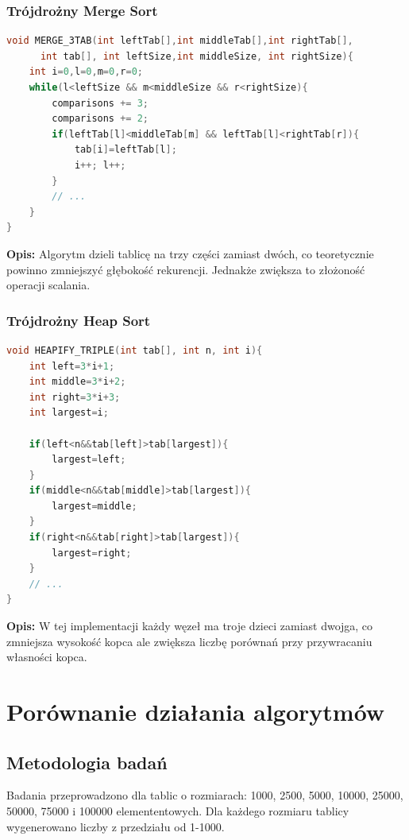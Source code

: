 \documentclass[12pt,a4paper]{article}
\begin{document}
\subsubsection{Trójdrożny Merge Sort}
\begin{lstlisting}[language=C++,caption=Merge Sort z trzema podtablicami]
void MERGE_3TAB(int leftTab[],int middleTab[],int rightTab[],
      int tab[], int leftSize,int middleSize, int rightSize){
    int i=0,l=0,m=0,r=0;
    while(l<leftSize && m<middleSize && r<rightSize){
        comparisons += 3;
        comparisons += 2;
        if(leftTab[l]<middleTab[m] && leftTab[l]<rightTab[r]){
            tab[i]=leftTab[l];
            i++; l++;
        }
        // ... 
    }
}
\end{lstlisting}
\textbf{Opis:} Algorytm dzieli tablicę na trzy części zamiast dwóch, co teoretycznie powinno zmniejszyć głębokość rekurencji. Jednakże zwiększa to złożoność operacji scalania.

\subsubsection{Trójdrożny Heap Sort}
\begin{lstlisting}[language=C++,caption=Kopiec trójkowy]
void HEAPIFY_TRIPLE(int tab[], int n, int i){
    int left=3*i+1;
    int middle=3*i+2;
    int right=3*i+3;
    int largest=i;
    
    if(left<n&&tab[left]>tab[largest]){
        largest=left;
    }
    if(middle<n&&tab[middle]>tab[largest]){
        largest=middle;
    }
    if(right<n&&tab[right]>tab[largest]){
        largest=right;
    }
    // ... 
}
\end{lstlisting}
\textbf{Opis:} W tej implementacji każdy węzeł ma troje dzieci zamiast dwojga, co zmniejsza wysokość kopca ale zwiększa liczbę porównań przy przywracaniu własności kopca.

\section{Porównanie działania algorytmów}

\subsection{Metodologia badań}
Badania przeprowadzono dla tablic o rozmiarach: 1000, 2500, 5000, 10000, 25000, 50000, 75000 i 100000 elemententowych. Dla każdego rozmiaru tablicy wygenerowano liczby z przedziału od 1-1000.
\end{document}
